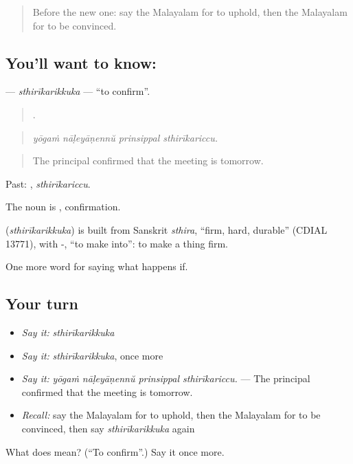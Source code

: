 \label{lesson:ML-C454-sthirikarikkuka}



\begin{quote}
Before the new one: say the Malayalam for to uphold, then the Malayalam for to be convinced.
\end{quote}

\subsection*{You'll want to know: }
\textbf{} — \emph{sthirīkarikkuka} — \textquotedblleft{}to confirm\textquotedblright{}.

\begin{quote}
   .
\end{quote}

\begin{quote}
\emph{yōgaṁ nāḷeyāṇennŭ prinsippal sthirīkariccu.}
\end{quote}

\begin{quote}
The principal confirmed that the meeting is tomorrow.
\end{quote}

Past: , \emph{sthirīkariccu}.

The noun is , confirmation.

\begin{cousinweb}
\textbf{} (\emph{sthirīkarikkuka}) is built from Sanskrit \emph{sthira}, \textquotedblleft{}firm, hard, durable\textquotedblright{} (CDIAL 13771), with -, \textquotedblleft{}to make into\textquotedblright{}: to make a thing firm.
\end{cousinweb}

\begin{grammarlens}[title={What you've built}]
One more word for saying what happens if.
\end{grammarlens}

\subsection*{Your turn}
\begin{itemize}
\raggedright
  \item \emph{Say it:} \emph{sthirīkarikkuka}
  \item \emph{Say it:} \emph{sthirīkarikkuka}, once more
  \item \emph{Say it:} \emph{yōgaṁ nāḷeyāṇennŭ prinsippal sthirīkariccu.} — The principal confirmed that the meeting is tomorrow.
  \item \emph{Recall:} say the Malayalam for to uphold, then the Malayalam for to be convinced, then say \emph{sthirīkarikkuka} again
\end{itemize}

\begin{tcolorbox}[breakable,colback=teal!4,colframe=teal!35!black,title={Before you move on}]
What does  mean? (\textquotedblleft{}To confirm\textquotedblright{}.) Say it once more.
\end{tcolorbox}
